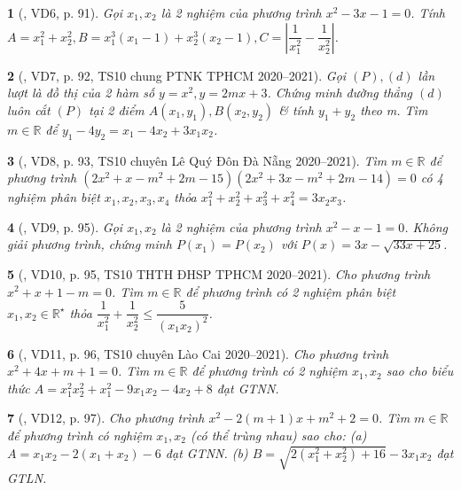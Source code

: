 \documentclass{article}
\newtheorem{baitoan}{}
\begin{document}
\begin{baitoan}[\cite{Thu_Viet_Minh_ptb2}, VD6, p. 91]
	Gọi $x_1,x_2$ là 2 nghiệm của phương trình $x^2 - 3x - 1 = 0$. Tính $A = x_1^2 + x_2^2,B = x_1^3(x_1 - 1) + x_2^3(x_2 - 1),C = \left|\dfrac{1}{x_1^2} - \dfrac{1}{x_2^2}\right|$.
\end{baitoan}

\begin{baitoan}[\cite{Thu_Viet_Minh_ptb2}, VD7, p. 92, TS10 chung PTNK TPHCM 2020--2021]
	Gọi $(P),(d)$ lần lượt là đồ thị của 2 hàm số $y = x^2,y = 2mx + 3$. Chứng minh đường thẳng $(d)$ luôn cắt $(P)$ tại 2 điểm $A(x_1,y_1),B(x_2,y_2)$ \& tính $y_1 + y_2$ theo m. Tìm $m\in\mathbb{R}$ để $y_1 - 4y_2 = x_1 - 4x_2 + 3x_1x_2$.
\end{baitoan}

\begin{baitoan}[\cite{Thu_Viet_Minh_ptb2}, VD8, p. 93, TS10 chuyên Lê Quý Đôn Đà Nẵng 2020--2021]
	Tìm $m\in\mathbb{R}$ để phương trình $(2x^2 + x - m^2 + 2m - 15)(2x^2 + 3x - m^2 + 2m - 14) = 0$ có 4 nghiệm phân biệt $x_1,x_2,x_3,x_4$ thỏa $x_1^2 + x_2^2 + x_3^2 + x_4^2 = 3x_2x_3$.
\end{baitoan}

\begin{baitoan}[\cite{Thu_Viet_Minh_ptb2}, VD9, p. 95]
	Gọi $x_1,x_2$ là 2 nghiệm của phương trình $x^2 - x - 1 = 0$. Không giải phương trình, chứng minh $P(x_1) = P(x_2)$ với $P(x) = 3x - \sqrt{33x + 25}$.
\end{baitoan}

\begin{baitoan}[\cite{Thu_Viet_Minh_ptb2}, VD10, p. 95, TS10 THTH ĐHSP TPHCM 2020--2021]
	Cho phương trình $x^2 + x + 1 - m = 0$. Tìm $m\in\mathbb{R}$ để phương trình có 2 nghiệm phân biệt $x_1,x_2\in\mathbb{R}^\star$ thỏa $\dfrac{1}{x_1^2} + \dfrac{1}{x_2^2}\le\dfrac{5}{(x_1x_2)^2}$.
\end{baitoan}

\begin{baitoan}[\cite{Thu_Viet_Minh_ptb2}, VD11, p. 96, TS10 chuyên Lào Cai 2020--2021]
	Cho phương trình $x^2 + 4x + m + 1 = 0$. Tìm $m\in\mathbb{R}$ để phương trình có 2 nghiệm $x_1,x_2$ sao cho biểu thức $A = x_1^2x_2^2 + x_1^2 - 9x_1x_2 - 4x_2 + 8$ đạt {\rm GTNN}.
\end{baitoan}

\begin{baitoan}[\cite{Thu_Viet_Minh_ptb2}, VD12, p. 97]
	Cho phương trình $x^2 - 2(m + 1)x + m^2 + 2 = 0$. Tìm $m\in\mathbb{R}$ để phương trình có nghiệm $x_1,x_2$ (có thể trùng nhau) sao cho: (a) $A = x_1x_2 - 2(x_1 + x_2) - 6$ đạt {\rm GTNN}. (b) $B =  \sqrt{2(x_1^2 + x_2^2) + 16} - 3x_1x_2$ đạt {\rm GTLN}.
\end{baitoan}
\end{document}

